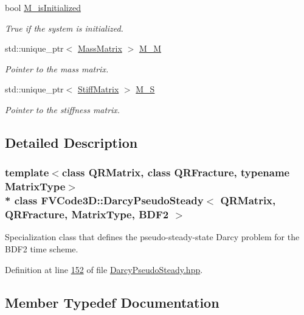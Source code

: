 \begin{DoxyCompactItemize}
bool \hyperlink{classFVCode3D_1_1DarcyPseudoSteady_3_01QRMatrix_00_01QRFracture_00_01MatrixType_00_01BDF2_01_4_ad19cc49965227320036c2dfc68a2baef}{M\+\_\+is\+Initialized}
\begin{DoxyCompactList}\small\item\em True if the system is initialized. \end{DoxyCompactList}\item 
std\+::unique\+\_\+ptr$<$ \hyperlink{classFVCode3D_1_1MassMatrix}{Mass\+Matrix} $>$ \hyperlink{classFVCode3D_1_1DarcyPseudoSteady_3_01QRMatrix_00_01QRFracture_00_01MatrixType_00_01BDF2_01_4_a925affb9e3841f7f9da63e45474a1291}{M\+\_\+M}
\begin{DoxyCompactList}\small\item\em Pointer to the mass matrix. \end{DoxyCompactList}\item 
std\+::unique\+\_\+ptr$<$ \hyperlink{classFVCode3D_1_1StiffMatrix}{Stiff\+Matrix} $>$ \hyperlink{classFVCode3D_1_1DarcyPseudoSteady_3_01QRMatrix_00_01QRFracture_00_01MatrixType_00_01BDF2_01_4_aec1af52be19e9b13e127e1738104ef73}{M\+\_\+S}
\begin{DoxyCompactList}\small\item\em Pointer to the stiffness matrix. \end{DoxyCompactList}\end{DoxyCompactItemize}


\subsection{Detailed Description}
\subsubsection*{template$<$class Q\+R\+Matrix, class Q\+R\+Fracture, typename Matrix\+Type$>$\\*
class F\+V\+Code3\+D\+::\+Darcy\+Pseudo\+Steady$<$ Q\+R\+Matrix, Q\+R\+Fracture, Matrix\+Type, B\+D\+F2 $>$}

Specialization class that defines the pseudo-\/steady-\/state Darcy problem for the B\+D\+F2 time scheme. 

Definition at line \hyperlink{DarcyPseudoSteady_8hpp_source_l00152}{152} of file \hyperlink{DarcyPseudoSteady_8hpp_source}{Darcy\+Pseudo\+Steady.\+hpp}.



\subsection{Member Typedef Documentation}
